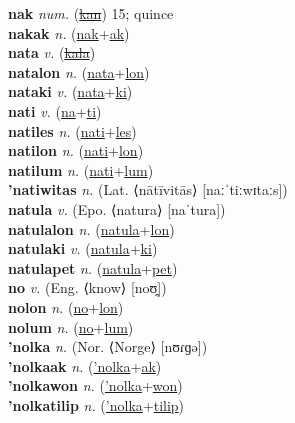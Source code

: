 \textbf{nak} \textit{num.} (\hyperref[kan]{\sout{kan}})
15; quince \label{nak} \\
\textbf{nakak} \textit{n.} (\hyperref[nak]{nak}+\hyperref[ak]{ak})
 \label{nakak} \\
\textbf{nata} \textit{v.} (\hyperref[kala]{\sout{kala}})
 \label{nata} \\
\textbf{natalon} \textit{n.} (\hyperref[nata]{nata}+\hyperref[lon]{lon})
 \label{natalon} \\
\textbf{nataki} \textit{v.} (\hyperref[nata]{nata}+\hyperref[ki]{ki})
 \label{nataki} \\
\textbf{nati} \textit{v.} (\hyperref[na]{na}+\hyperref[ti]{ti})
 \label{nati} \\
\textbf{natiles} \textit{n.} (\hyperref[nati]{nati}+\hyperref[les]{les})
 \label{natiles} \\
\textbf{natilon} \textit{n.} (\hyperref[nati]{nati}+\hyperref[lon]{lon})
 \label{natilon} \\
\textbf{natilum} \textit{n.} (\hyperref[nati]{nati}+\hyperref[lum]{lum})
 \label{natilum} \\
\textbf{'natiwitas} \textit{n.} (Lat. ⟨nātīvitās⟩ [naːˈtiːwɪtaːs])
 \label{'natiwitas} \\
\textbf{natula} \textit{v.} (Epo. ⟨natura⟩ [naˈtura])
 \label{natula} \\
\textbf{natulalon} \textit{n.} (\hyperref[natula]{natula}+\hyperref[lon]{lon})
 \label{natulalon} \\
\textbf{natulaki} \textit{v.} (\hyperref[natula]{natula}+\hyperref[ki]{ki})
 \label{natulaki} \\
\textbf{natulapet} \textit{n.} (\hyperref[natula]{natula}+\hyperref[pet]{pet})
 \label{natulapet} \\
\textbf{no} \textit{v.} (Eng. ⟨know⟩ [noʊ̯])
 \label{no} \\
\textbf{nolon} \textit{n.} (\hyperref[no]{no}+\hyperref[lon]{lon})
 \label{nolon} \\
\textbf{nolum} \textit{n.} (\hyperref[no]{no}+\hyperref[lum]{lum})
 \label{nolum} \\
\textbf{'nolka} \textit{n.} (Nor. ⟨Norge⟩ [nʊɾɡə])
 \label{'nolka} \\
\textbf{'nolkaak} \textit{n.} (\hyperref['nolka]{'nolka}+\hyperref[ak]{ak})
 \label{'nolkaak} \\
\textbf{'nolkawon} \textit{n.} (\hyperref['nolka]{'nolka}+\hyperref[won]{won})
 \label{'nolkawon} \\
\textbf{'nolkatilip} \textit{n.} (\hyperref['nolka]{'nolka}+\hyperref[tilip]{tilip})
